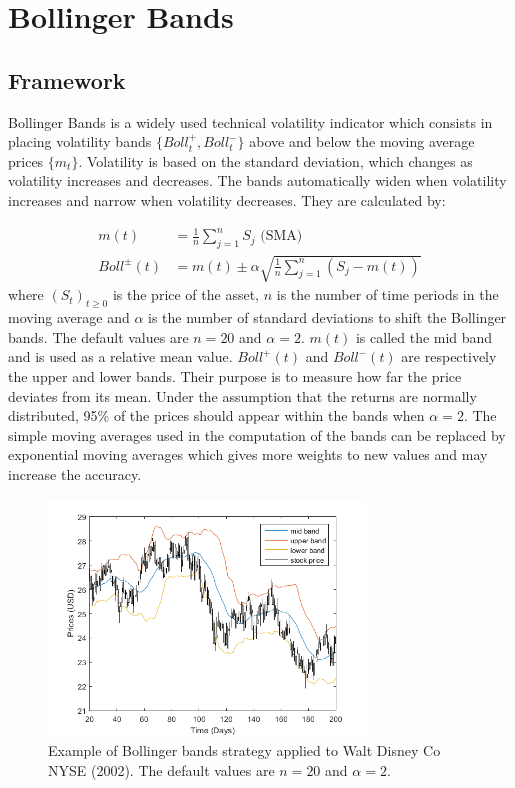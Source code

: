 \documentclass[11pt,a4,twosided,singlespacing,titlepagenumber=on]{scrreprt}
\numberwithin{equation}{chapter} %
\theoremstyle{remark}
\begin{document}
\section{Bollinger Bands}
\subsection{Framework}
Bollinger Bands is a widely used technical volatility indicator which consists in placing volatility bands $\{Boll^+_t, Boll^-_t\}$ above and below the moving average prices $\{m_t\}$. Volatility is based on the standard deviation, which changes as volatility increases and decreases. The bands automatically widen when volatility increases and narrow when volatility decreases. They are calculated by:

\begin{align*}
m(t) &= \frac{1}{n}\sum_{j=1}^n S_j \text{ (SMA)} \\
Boll^\pm(t) &= m(t) \pm \alpha \sqrt{\frac{1}{n} \sum_{j=1}^n \left(S_j - m(t) \right)}
\end{align*}
where $(S_t)_{t \geq 0}$ is the price of the asset, $n$ is the number of time periods in the moving average and $\alpha$ is the number of standard deviations to shift the Bollinger bands. The default values are $n = 20$ and $\alpha = 2$. $m(t)$ is called the mid band and is used as a relative mean value. $Boll^+(t)$ and $Boll^-(t)$ are respectively the upper and lower bands. Their purpose is to measure how far the price deviates from its mean. Under the assumption that the returns are normally distributed, 95\% of the prices should appear within the bands when $\alpha = 2$. The simple moving averages used in the computation of the bands can be replaced by exponential moving averages which gives more weights to new values and may increase the accuracy.

\begin{figure}[htb]
\centering
\includegraphics[width = 0.75\textwidth]{bollinger_bands_intro}
\caption{Example of Bollinger bands strategy applied to Walt Disney Co NYSE (2002). The default values are $n = 20$ and $\alpha = 2$.}
\label{bollinger_bands_intro}
\end{figure}
\end{document}
